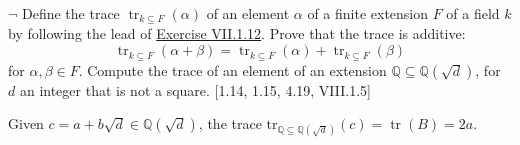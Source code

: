 \hypertarget{Exercise VII.1.13}{}
\begin{problem}[1.13]
$\neg$ Define the trace $\operatorname{tr}_{k \subseteq F}(\alpha)$ of an element $\alpha$ of a finite extension $F$ of a field $k$ by following the lead of \hyperlink{Exercise VII.1.12}{Exercise VII.1.12}. Prove that the trace is additive:
$$
\operatorname{tr}_{k \subseteq F}(\alpha+\beta)=\operatorname{tr}_{k \subseteq F}(\alpha)+\operatorname{tr}_{k \subseteq F}(\beta)
$$
for $\alpha, \beta \in F$. Compute the trace of an element of an extension $\mathbb{Q} \subseteq \mathbb{Q}(\sqrt{d})$, for $d$ an integer that is not a square. [1.14, 1.15, 4.19, VIII.1.5]
\end{problem}
\begin{solution}
	Given $c=a+b\sqrt{d}\in \mathbb{Q}\left(\sqrt{d}\right)$, the trace $\mathrm{tr}_{\mathbb{Q} \subseteq \mathbb{Q}(\sqrt{d})}(c)=\operatorname{tr}(B)=2a$.
\end{solution}

